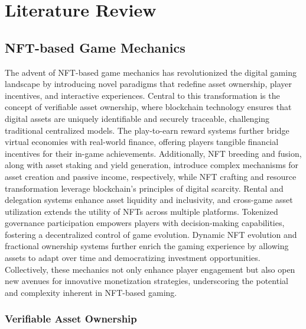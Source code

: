 \chapter{Literature Review}

\section{NFT-based Game Mechanics}

The advent of NFT-based game mechanics has revolutionized the digital gaming
landscape by introducing novel paradigms that redefine asset ownership, player
incentives, and interactive experiences. Central to this transformation is the
concept of verifiable asset ownership, where blockchain technology ensures that
digital assets are uniquely identifiable and securely traceable, challenging
traditional centralized models. The play-to-earn reward systems further bridge
virtual economies with real-world finance, offering players tangible financial
incentives for their in-game achievements. Additionally, NFT breeding and
fusion, along with asset staking and yield generation, introduce complex
mechanisms for asset creation and passive income, respectively, while NFT
crafting and resource transformation leverage blockchain's principles of digital
scarcity. Rental and delegation systems enhance asset liquidity and inclusivity,
and cross-game asset utilization extends the utility of NFTs across multiple
platforms. Tokenized governance participation empowers players with
decision-making capabilities, fostering a decentralized control of game
evolution. Dynamic NFT evolution and fractional ownership systems further enrich
the gaming experience by allowing assets to adapt over time and democratizing
investment opportunities. Collectively, these mechanics not only enhance player
engagement but also open new avenues for innovative monetization strategies,
underscoring the potential and complexity inherent in NFT-based gaming.

\subsection{Verifiable Asset Ownership}

